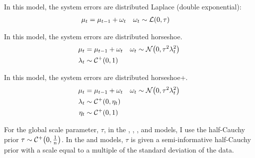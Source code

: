 \documentclass[12pt]{article}
\begin{document}
\begin{description}[font = \normalfont\ModelII]
\item[Laplace] In this model, the system errors are distributed Laplace (double exponential):
  \begin{equation}
    \label{dlm:eq:22}
    \begin{aligned}[t]
      \mu_{t} &= \mu_{t - 1} + \omega_{t} & \omega_{t} & \sim \mathcal{L}\mathopen{}\left(0, \tau\right)\mathclose{}
    \end{aligned}
  \end{equation}
\item[Horseshoe] In this model, the system errors are distributed horseshoe.
  \begin{equation}
    \label{dlm:eq:19}
    \begin{aligned}[t]
      \mu_{t} &= \mu_{t - 1} + \omega_{t} & \omega_{t} & \sim \mathcal{N}\mathopen{}\left(0, \tau^{2} \lambda^{2}_{t}\right)\mathclose{} \\
      \lambda_{t} &\sim \mathcal{C^+}\mathopen{}\left(0, 1\right)\mathclose{}
    \end{aligned}
  \end{equation}
\item[Horseshoe+] In this model, the system errors are distributed horseshoe+.
  \begin{equation}
    \label{dlm:eq:23}
    \begin{aligned}[t]
      \mu_{t} &= \mu_{t - 1} + \omega_{t} & \omega_{t} & \sim \mathcal{N}\mathopen{}\left(0, \tau^{2} \lambda^{2}_{t}\right)\mathclose{} \\
      \lambda_{t} &\sim \mathcal{C^+}\mathopen{}\left(0, \eta_{t}\right)\mathclose{} \\
      \eta_{t} &\sim \mathcal{C^+}\mathopen{}\left(0, 1\right)\mathclose{}
    \end{aligned}
  \end{equation}
\end{description}
For the global scale parameter, $\tau$, in the , , , and  models, I use the half-Cauchy prior $\tau \sim \mathcal{C^+}\mathopen{}\left(0, \frac{1}{n}\right)\mathclose{}$.
In the  and  models, $\tau$ is given a semi-informative half-Cauchy prior with a scale equal to a multiple of the standard deviation of the data.
\end{document}
